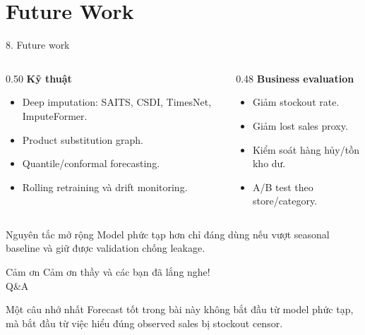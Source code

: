 \documentclass[aspectratio=169,10pt]{beamer}
\begin{document}
\section{Future Work}
\begin{frame}{8. Future work}
    \begin{columns}[T]
        \begin{column}{0.50\linewidth}
            \textbf{Kỹ thuật}
            \begin{itemize}
                \item Deep imputation: SAITS, CSDI, TimesNet, ImputeFormer.
                \item Product substitution graph.
                \item Quantile/conformal forecasting.
                \item Rolling retraining và drift monitoring.
            \end{itemize}
        \end{column}
        \begin{column}{0.48\linewidth}
            \textbf{Business evaluation}
            \begin{itemize}
                \item Giảm stockout rate.
                \item Giảm lost sales proxy.
                \item Kiểm soát hàng hủy/tồn kho dư.
                \item A/B test theo store/category.
            \end{itemize}
        \end{column}
    \end{columns}
    \vspace{0.2cm}
    \begin{block}{Nguyên tắc mở rộng}
    Model phức tạp hơn chỉ đáng dùng nếu vượt seasonal baseline và giữ được validation chống leakage.
    \end{block}
\end{frame}

\begin{frame}{Cảm ơn}
    \centering
    \vspace{1cm}
    {\Large Cảm ơn thầy và các bạn đã lắng nghe!}\\[0.5cm]
    {\large Q\&A}\\[0.8cm]
    \begin{block}{Một câu nhớ nhất}
    Forecast tốt trong bài này không bắt đầu từ model phức tạp, mà bắt đầu từ việc hiểu đúng observed sales bị stockout censor.
    \end{block}
\end{frame}
\end{document}
